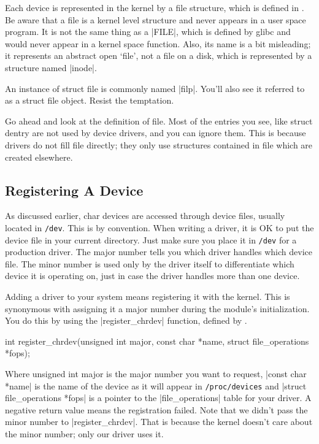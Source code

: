 \documentclass[10pt, oneside]{book}
\begin{document}
Each device is represented in the kernel by a file structure, which is defined in .
Be aware that a file is a kernel level structure and never appears in a user space program.
It is not the same thing as a \cpp|FILE|, which is defined by glibc and would never appear in a kernel space function.
Also, its name is a bit misleading; it represents an abstract open `file', not a file on a disk, which is represented by a structure named \cpp|inode|.

An instance of struct file is commonly named \cpp|filp|.
You'll also see it referred to as a struct file object.
Resist the temptation.

Go ahead and look at the definition of file.
Most of the entries you see, like struct dentry are not used by device drivers, and you can ignore them.
This is because drivers do not fill file directly; they only use structures contained in file which are created elsewhere.

\subsection{Registering A Device}
\label{sec:register_device}
As discussed earlier, char devices are accessed through device files, usually located in \verb|/dev|.
This is by convention. When writing a driver, it is OK to put the device file in your current directory.
Just make sure you place it in \verb|/dev| for a production driver.
The major number tells you which driver handles which device file.
The minor number is used only by the driver itself to differentiate which device it is operating on, just in case the driver handles more than one device.

Adding a driver to your system means registering it with the kernel.
This is synonymous with assigning it a major number during the module's initialization.
You do this by using the \cpp|register_chrdev| function, defined by .

\begin{code}
int register_chrdev(unsigned int major, const char *name, struct file_operations *fops);
\end{code}

Where unsigned int major is the major number you want to request, \cpp|const char *name| is the name of the device as it will appear in \verb|/proc/devices| and \cpp|struct file_operations *fops| is a pointer to the \cpp|file_operations| table for your driver.
A negative return value means the registration failed. Note that we didn't pass the minor number to \cpp|register_chrdev|.
That is because the kernel doesn't care about the minor number; only our driver uses it.
\end{document}

